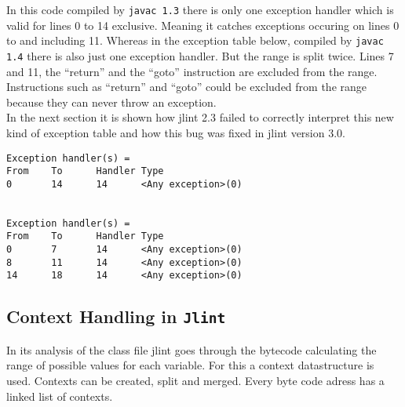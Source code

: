 \documentclass[11pt,twoside,a4paper,draft]{article}
\begin{document}
In this code compiled by \texttt{javac 1.3} there is only one exception handler
which is valid for lines 0 to 14 exclusive. Meaning it catches
exceptions occuring on lines 0 to and including 11. Whereas in the
exception table below, compiled by \texttt{javac 1.4} there is also
just one exception handler. But the range is split twice.
Lines 7 and 11, the ``return'' and the ``goto'' instruction
are excluded from the range. 
Instructions such as ``return'' and ``goto'' could be excluded from the range
because they can never throw an exception.
\\In the next section it is shown how jlint 2.3 
failed to correctly interpret this new kind of exception table and how this
bug was fixed in jlint version 3.0. 

\begin{verbatim}
Exception handler(s) =
From    To      Handler Type
0       14      14      <Any exception>(0)


Exception handler(s) =
From    To      Handler Type
0       7       14      <Any exception>(0)
8       11      14      <Any exception>(0)
14      18      14      <Any exception>(0)

\end{verbatim}

\subsection {Context Handling in \texttt{Jlint}}

In its analysis of the class file jlint goes through the bytecode calculating
the range of possible values for each variable. For this a context 
datastructure is used. Contexts can be created, split and merged. Every byte
code adress has a linked list of contexts.
\end{document}
